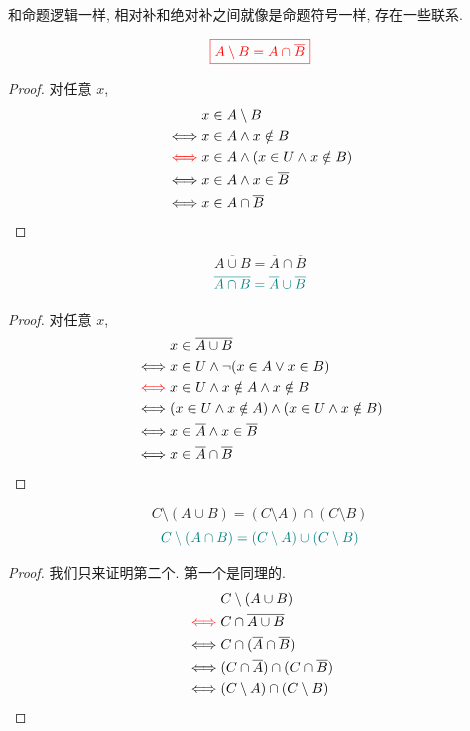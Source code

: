 和命题逻辑一样, 相对补和绝对补之间就像是命题符号一样, 存在一些联系. 

\begin{theorem}
  \[
    \textcolor{red}{\boxed{A \setminus B = A \cap \overline{B}}}
  \]
\end{theorem}

\begin{proof}
  对任意 $x$,
  \setcounter{equation}{0}
  \begin{align*}
    &x \in A \setminus B \\
    \iff & x \in A \land x \notin B \\
    \textcolor{red}{\iff} & x \in A \land (x \in U \land x \notin B) \\
    \iff & x \in A \land x \in \overline{B} \\
    \iff & x \in A \cap \overline{B}
  \end{align*}
\end{proof}

\begin{theorem}

  \[
    \overline{A \cup B} = \overline{A} \cap \overline{B}
  \]
  \[
    \textcolor{teal}{\overline{A \cap B} = \overline{A} \cup \overline{B}}
  \]
\end{theorem}
\begin{proof}
    对任意 $x$, 
  \setcounter{equation}{0}
  \begin{align*}
    &x \in \overline{A \cup B} \\
    \iff & x \in U \land \lnot (x \in A \lor x \in B) \\
    \textcolor{red}{\iff} & x \in U \land x \notin A \land x \notin B \\
    \iff & (x \in U \land x \notin A) \land (x \in U \land x \notin B) \\
    \iff & x \in \overline{A} \land x \in \overline{B} \\
    \iff & x \in \overline{A} \cap \overline{B}
  \end{align*}
\end{proof}

\begin{theorem}
  \[
    C \setminus (A \cup B) = (C \setminus A) \cap (C \setminus B)
  \]
  \[
    \textcolor{teal}{C \setminus (A \cap B) = (C \setminus A) \cup (C \setminus B)}
  \]
\end{theorem}

\begin{proof}
  我们只来证明第二个. 第一个是同理的. 
  \setcounter{equation}{0}
  \begin{align*}
    &C \setminus (A \cup B) \\
    \textcolor{red}{\iff} & C \cap \overline{A \cup B} \\
    \iff & C \cap (\overline{A} \cap \overline{B}) \\
    \iff & (C \cap \overline{A}) \cap (C \cap \overline{B}) \\
    \iff & (C \setminus A) \cap (C \setminus B)
  \end{align*}
\end{proof}


